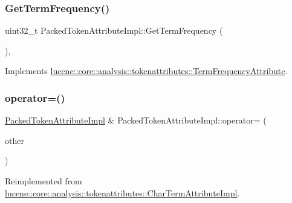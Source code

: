 \subsubsection{\texorpdfstring{Get\+Term\+Frequency()}{GetTermFrequency()}}
{\footnotesize\ttfamily uint32\+\_\+t Packed\+Token\+Attribute\+Impl\+::\+Get\+Term\+Frequency (\begin{DoxyParamCaption}{ }\end{DoxyParamCaption})\hspace{0.3cm}{\ttfamily [override]}, {\ttfamily [virtual]}}



Implements \mbox{\hyperlink{classlucene_1_1core_1_1analysis_1_1tokenattributes_1_1TermFrequencyAttribute_a2ddffa369215ac61e2eadbab087f5d74}{lucene\+::core\+::analysis\+::tokenattributes\+::\+Term\+Frequency\+Attribute}}.

\mbox{\label{classlucene_1_1core_1_1analysis_1_1tokenattributes_1_1PackedTokenAttributeImpl_a9519720f5eb790ef3e796cefbcbecc96}} 
\subsubsection{\texorpdfstring{operator=()}{operator=()}\hspace{0.1cm}{\footnotesize\ttfamily [1/2]}}
{\footnotesize\ttfamily \mbox{\hyperlink{classlucene_1_1core_1_1analysis_1_1tokenattributes_1_1PackedTokenAttributeImpl}{Packed\+Token\+Attribute\+Impl}} \& Packed\+Token\+Attribute\+Impl\+::operator= (\begin{DoxyParamCaption}\item[{const \mbox{\hyperlink{classlucene_1_1core_1_1util_1_1AttributeImpl}{lucene\+::core\+::util\+::\+Attribute\+Impl}} \&}]{other }\end{DoxyParamCaption})\hspace{0.3cm}{\ttfamily [virtual]}}



Reimplemented from \mbox{\hyperlink{classlucene_1_1core_1_1analysis_1_1tokenattributes_1_1CharTermAttributeImpl_ac49b714c3f8e438ddaa27dc1a2421144}{lucene\+::core\+::analysis\+::tokenattributes\+::\+Char\+Term\+Attribute\+Impl}}.

